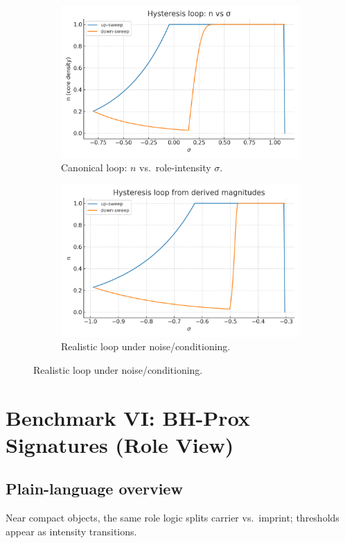 \documentclass[12pt,a4paper,oneside]{scrreprt}
\begin{document}
\begin{figure}[htbp]\centering
  \begin{subfigure}[t]{0.49\linewidth}
    \includegraphics[width=\linewidth]{hysteresis_n_vs_sigma.png}
    \caption{Canonical loop: $n$ vs.\ role-intensity $\sigma$.}
    \label{fig:hyst:canon}
  \end{subfigure}\hfill
  \begin{subfigure}[t]{0.49\linewidth}
    \includegraphics[width=\linewidth]{realism_hysteresis_n_sigma.png}
    \caption{Realistic loop under noise/conditioning.}
    \label{fig:hyst:real}
  \end{subfigure}
\end{figure}

\chapter{Benchmark VI: BH-Prox Signatures (Role View)}
\section*{Plain-language overview}
Near compact objects, the same role logic splits carrier vs.\ imprint; thresholds appear as intensity transitions.
\end{document}
